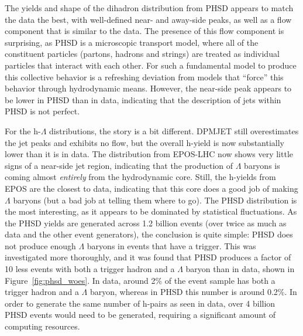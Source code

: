 The yields and shape of the dihadron distribution from PHSD appears to match the data the best, with well-defined near- and away-side peaks, as well as a flow component that is similar to the data. The presence of this flow component is surprising, as PHSD is a microscopic transport model, where all of the constituent particles (partons, hadrons and strings) are treated as individual particles that interact with each other. For such a fundamental model to produce this collective behavior is a refreshing deviation from models that ``force'' this behavior through hydrodynamic means. However, the near-side peak appears to be lower in PHSD than in data, indicating that the description of jets within PHSD is not perfect.

For the h-$\Lambda$ distributions, the story is a bit different. DPMJET still overestimates the jet peaks and exhibits no flow, but the overall h-\lmb yield is now substantially lower than it is in data. The distribution from EPOS-LHC now shows very little signs of a near-side jet region, indicating that the production of $\Lambda$ baryons is coming almost \textit{entirely} from the hydrodynamic core. Still, the h-\lmb yields from EPOS are the closest to data, indicating that this core does a good job of making $\Lambda$ baryons (but a bad job at telling them where to go). The PHSD distribution is the most interesting, as it appears to be dominated by statistical fluctuations. As the PHSD yields are generated across 1.2 billion events (over twice as much as data and the other event generators), the conclusion is quite simple: PHSD does not produce enough $\Lambda$ baryons in events that have a trigger. This was investigated more thoroughly, and it was found that PHSD produces a factor of 10 less events with both a trigger hadron and a $\Lambda$ baryon than in data, shown in Figure~\ref{fig:phsd_woes}. In data, around 2\% of the event sample has both a trigger hadron and a $\Lambda$ baryon, whereas in PHSD this number is around 0.2\%. In order to generate the same number of h-\lmb pairs as seen in data, over 4 billion PHSD events would need to be generated, requiring a significant amount of computing resources.


